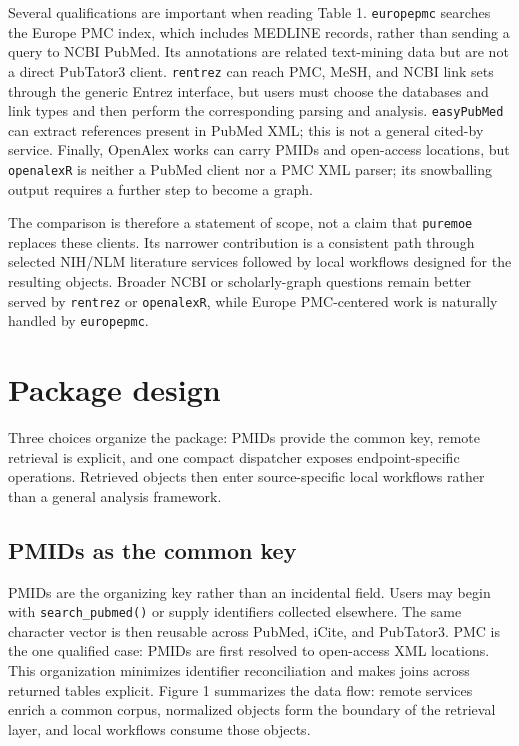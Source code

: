 Several qualifications are important when reading Table 1. \texttt{europepmc}
searches the Europe PMC index, which includes MEDLINE records, rather than
sending a query to NCBI PubMed. Its annotations are related text-mining data
but are not a direct PubTator3 client. \texttt{rentrez} can reach PMC, MeSH, and NCBI
link sets through the generic Entrez interface, but users must choose the
databases and link types and then perform the corresponding parsing and
analysis. \texttt{easyPubMed} can extract references present in PubMed XML; this is not
a general cited-by service. Finally, OpenAlex works can carry PMIDs and
open-access locations, but \texttt{openalexR} is neither a PubMed client nor a PMC XML
parser; its snowballing output requires a further step to become a graph.

The comparison is therefore a statement of scope, not a claim that \texttt{puremoe}
replaces these clients. Its narrower contribution is a consistent path through
selected NIH/NLM literature services followed by local workflows designed for
the resulting objects. Broader NCBI or scholarly-graph questions remain better
served by \texttt{rentrez} or \texttt{openalexR}, while Europe PMC-centered work is naturally
handled by \texttt{europepmc}.

\section{Package design}\label{package-design}

Three choices organize the package: PMIDs provide the common key, remote
retrieval is explicit, and one compact dispatcher exposes endpoint-specific
operations. Retrieved objects then enter source-specific local workflows rather
than a general analysis framework.

\subsection{PMIDs as the common key}\label{pmids-as-the-common-key}

PMIDs are the organizing key rather than an incidental field. Users may begin
with \texttt{search\_pubmed()} or supply identifiers collected elsewhere. The same
character vector is then reusable across PubMed, iCite, and PubTator3. PMC is
the one qualified case: PMIDs are first resolved to open-access XML locations.
This organization minimizes identifier reconciliation and makes joins across
returned tables explicit. Figure 1 summarizes the data flow: remote services
enrich a common corpus, normalized objects form the boundary of the retrieval
layer, and local workflows consume those objects.

